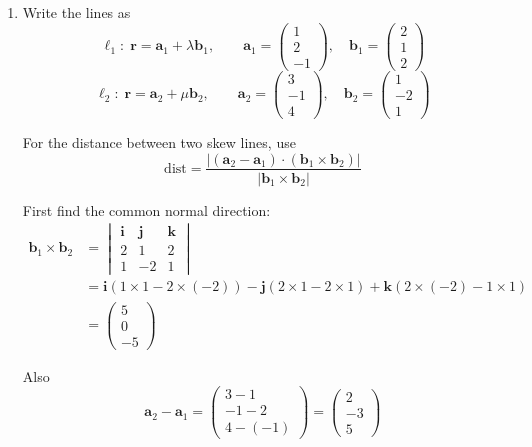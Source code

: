 \documentclass[leqno]{article}
\begin{document}
\begin{enumerate}[
  label=\textbf{\arabic*.},
  leftmargin=*,
  topsep=0pt,
  partopsep=0pt,
  parsep=0pt
]
\begin{djsSolution}
\begin{enumerate}[label=\textbf{(\alph*)}]
  \item Write the lines as
\[
\ell_1:\;\mathbf r=\mathbf a_1+\lambda \mathbf b_1,
\qquad
\mathbf a_1=\begin{pmatrix}1\\2\\-1\end{pmatrix},
\quad
\mathbf b_1=\begin{pmatrix}2\\1\\2\end{pmatrix}
\]
\[
\ell_2:\;\mathbf r=\mathbf a_2+\mu \mathbf b_2,
\qquad
\mathbf a_2=\begin{pmatrix}3\\-1\\4\end{pmatrix},
\quad
\mathbf b_2=\begin{pmatrix}1\\-2\\1\end{pmatrix}
\]

For the distance between two skew lines, use
\[
\mathrm{dist}
=\frac{\left\lvert(\mathbf a_2-\mathbf a_1)\cdot(\mathbf b_1\times\mathbf b_2)\right\rvert}
{\left\lvert\mathbf b_1\times\mathbf b_2\right\rvert}
\]

First find the common normal direction:
\begin{align*}
\mathbf b_1\times\mathbf b_2
&=
\begin{vmatrix}
\mathbf i & \mathbf j & \mathbf k\\
2&1&2\\
1&-2&1
\end{vmatrix} \\
&=\mathbf i(1\times 1-2\times(-2))-\mathbf j(2\times 1-2\times 1)+\mathbf k(2\times(-2)-1\times 1) \\
&=\begin{pmatrix}5\\0\\-5\end{pmatrix}
\end{align*}

Also
\[
\mathbf a_2-\mathbf a_1
=\begin{pmatrix}3-1\\-1-2\\4-(-1)\end{pmatrix}
=\begin{pmatrix}2\\-3\\5\end{pmatrix}
\]


\end{enumerate}
\end{djsSolution}
\end{enumerate}
\end{document}
